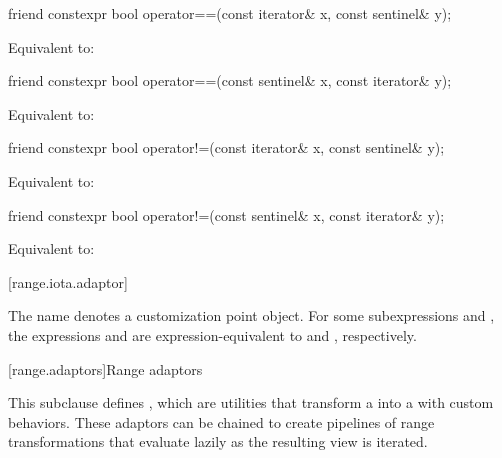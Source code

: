 \begin{itemdecl}
friend constexpr bool operator==(const iterator& x, const sentinel& y);
\end{itemdecl}

\begin{itemdescr}
\pnum
\effects Equivalent to: 
\end{itemdescr}

\begin{itemdecl}
friend constexpr bool operator==(const sentinel& x, const iterator& y);
\end{itemdecl}

\begin{itemdescr}
\pnum
\effects Equivalent to: 
\end{itemdescr}

\begin{itemdecl}
friend constexpr bool operator!=(const iterator& x, const sentinel& y);
\end{itemdecl}

\begin{itemdescr}
\pnum
\effects Equivalent to: 
\end{itemdescr}

\begin{itemdecl}
friend constexpr bool operator!=(const sentinel& x, const iterator& y);
\end{itemdecl}

\begin{itemdescr}
\pnum
\effects Equivalent to: 
\end{itemdescr}

[range.iota.adaptor]{}

\pnum
The name  denotes a
customization point object.
For some subexpressions  and , the expressions
 and 
are expression-equivalent to
 and , respectively.

[range.adaptors]{Range adaptors}

\pnum
This subclause defines , which are utilities that transform a
 into a  with custom behaviors. These
adaptors can be chained to create pipelines of range transformations that
evaluate lazily as the resulting view is iterated.

